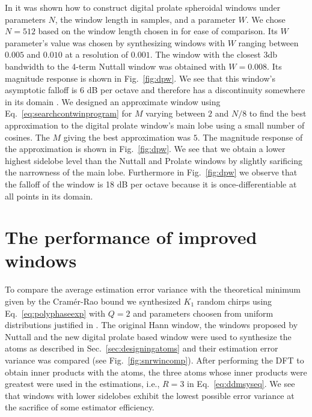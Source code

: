 \documentclass[twoside,a4paper]{article}
\begin{document}
In \cite{verma1996digital} it was shown how to construct digital prolate
spheroidal windows under parameters $N$, the window length in samples, and a
parameter $W$. We chose $N=512$ based on the window length chosen in
\cite{betser2009sinusoidal} for ease of comparison. Its $W$ parameter's value
was chosen by synthesizing windows with $W$ ranging between $0.005$ and $0.010$
at a resolution of $0.001$. The window with the closest 3db bandwidth to the
4-term Nuttall window was obtained with $W=0.008$. Its magnitude response is
shown in Fig.~\ref{fig:dpw}. We see that
this window's asymptotic falloff is 6 dB per octave and therefore has a
discontinuity somewhere in its domain \cite{nuttall1981some}. We designed an approximate
window using Eq.~\ref{eq:searchcontwinprogram} for $M$ varying between $2$ and
$N/8$ to find the best approximation to the digital prolate window's main lobe
using a small number of cosines. The $M$ giving the best approximation was $5$.
The magnitude response of the approximation is shown in
Fig.~\ref{fig:dpw}.  We see that we obtain a lower highest sidelobe
level than the Nuttall and Prolate windows by slightly sarificing the narrowness
of the main lobe. Furthermore in Fig.~\ref{fig:dpw} we observe that
the falloff of the window is 18 dB per octave because it is once-differentiable
at all points in its domain.

\section{The performance of improved windows}

To compare the average estimation error variance with the
theoretical minimum given by the Cram\'{e}r-Rao bound we synthesized $K_{1}$ random
chirps using Eq.~\ref{eq:polyphaseexp}
with $Q=2$ and parameters choosen from uniform distributions justified in
\cite{betser2009sinusoidal}. The original Hann window,
the windows proposed by Nuttall and the new digital prolate based window were
used to synthesize the atoms as described in Sec.~\ref{sec:designingatoms} and
their estimation error variance was compared (see
Fig.~\ref{fig:snrwincomp}). After performing the DFT to obtain inner products
with the atoms, the three atoms whose inner products were greatest were used in
the estimations, i.e., $R=3$ in Eq.~\ref{eq:ddmsyseq}. We see that windows with
lower sidelobes exhibit the lowest possible error variance at the sacrifice of
some estimator efficiency.
\end{document}
